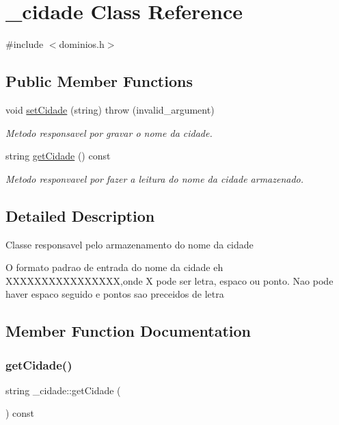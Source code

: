 \hypertarget{class__cidade}{}\section{\+\_\+cidade Class Reference}
\label{class__cidade}


{\ttfamily \#include $<$dominios.\+h$>$}

\subsection*{Public Member Functions}
\begin{DoxyCompactItemize}
\item 
void \mbox{\hyperlink{class__cidade_a162a0bfe2cf91357f92b665a5d496290}{set\+Cidade}} (string)  throw (invalid\+\_\+argument)
\begin{DoxyCompactList}\small\item\em Metodo responsavel por gravar o nome da cidade. \end{DoxyCompactList}\item 
string \mbox{\hyperlink{class__cidade_ab675745af0d5c1c3a6316b6826718e53}{get\+Cidade}} () const
\begin{DoxyCompactList}\small\item\em Metodo responvavel por fazer a leitura do nome da cidade armazenado. \end{DoxyCompactList}\end{DoxyCompactItemize}


\subsection{Detailed Description}
Classe responsavel pelo armazenamento do nome da cidade

O formato padrao de entrada do nome da cidade eh X\+X\+X\+X\+X\+X\+X\+X\+X\+X\+X\+X\+X\+X\+XX,onde X pode ser letra, espaco ou ponto. Nao pode haver espaco seguido e pontos sao preceidos de letra 

\subsection{Member Function Documentation}
\mbox{\label{class__cidade_ab675745af0d5c1c3a6316b6826718e53}} 
\subsubsection{\texorpdfstring{getCidade()}{getCidade()}}
{\footnotesize\ttfamily string \+\_\+cidade\+::get\+Cidade (\begin{DoxyParamCaption}{ }\end{DoxyParamCaption}) const\hspace{0.3cm}{\ttfamily [inline]}}



